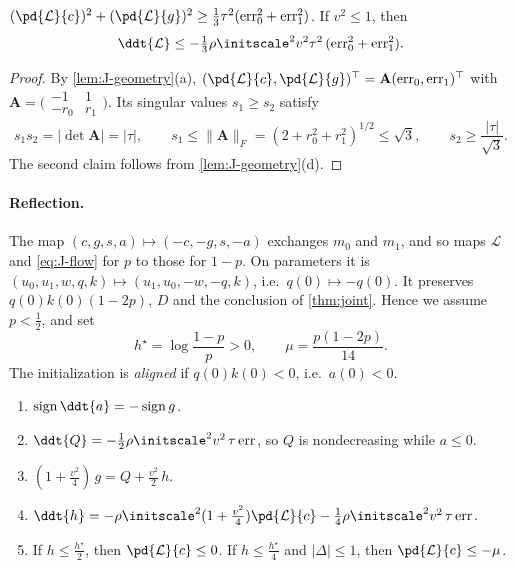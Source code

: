 \begin{lemma}
\label{lem:J-gradient}
$(\pd{\mathcal L}{c})^2+(\pd{\mathcal L}{g})^2\ge\frac{1}{3}\tau^2(\mathrm{err}_0^2+\mathrm{err}_1^2)$. If $v^2\le1$, then
\[
 \ddt{\mathcal L}\le-\tfrac{1}{3}\rho\initscale^2v^2\tau^2\,(\mathrm{err}_0^2+\mathrm{err}_1^2).
\]
\end{lemma}

\begin{proof}
By \cref{lem:J-geometry}(a), $(\pd{\mathcal L}{c},\pd{\mathcal L}{g})^\top=\mathbf A(\mathrm{err}_0,\mathrm{err}_1)^\top$ with $\mathbf A=\bigl(\begin{smallmatrix}-1&1\\-r_0&r_1\end{smallmatrix}\bigr)$. Its singular values $s_1\ge s_2$
satisfy
\[
 s_1s_2=|\det\mathbf A|=|\tau|,\qquad s_1\le\|\mathbf A\|_F=(2+r_0^2+r_1^2)^{1/2}\le\sqrt3,\qquad s_2\ge\frac{|\tau|}{\sqrt3} .
\]
The second claim follows from \cref{lem:J-geometry}(d).
\end{proof}

\paragraph{Reflection.} The map $(c,g,s,a)\mapsto(-c,-g,s,-a)$ exchanges $m_0$ and $m_1$, and so maps $\mathcal L$ and \cref{eq:J-flow} for $p$ to those
for $1-p$. On parameters it is $(u_0,u_1,w,q,k)\mapsto(u_1,u_0,-w,-q,k)$, i.e.\ $q(0)\mapsto-q(0)$. It preserves $q(0)k(0)(1-2p)$, $D$ and the
conclusion of \cref{thm:joint}. Hence we assume $p<\frac{1}{2}$, and set
\[
 h^\star=\log\frac{1-p}{p}>0,\qquad \mu=\frac{p(1-2p)}{14}.
\]
The initialization is \emph{aligned} if $q(0)k(0)<0$, i.e.\ $a(0)<0$.

\begin{lemma}
\label{lem:J-drift}
\begin{enumerate}[label=(\alph*),leftmargin=*,itemsep=2pt,topsep=3pt]
\item $\operatorname{sign}\ddt{a}=-\operatorname{sign}g$.
\item $\ddt{Q}=-\frac{1}{2}\rho\initscale^2v^2\,\tau\,\mathrm{err}$, so $Q$ is nondecreasing while $a\le0$.
\item $(1+\frac{v^2}{4})\,g=Q+\frac{v^2}{2}\,h$.
\item $\ddt{h}=-\rho\initscale^2(1+\frac{v^2}{4})\pd{\mathcal L}{c}-\frac{1}{4}\rho\initscale^2v^2\,\tau\,\mathrm{err}$.
\item If $h\le\frac{h^\star}{2}$, then $\pd{\mathcal L}{c}\le0$. If $h\le\frac{h^\star}{4}$ and $|\Delta|\le1$, then $\pd{\mathcal L}{c}\le-\mu$.
\end{enumerate}
\end{lemma}

